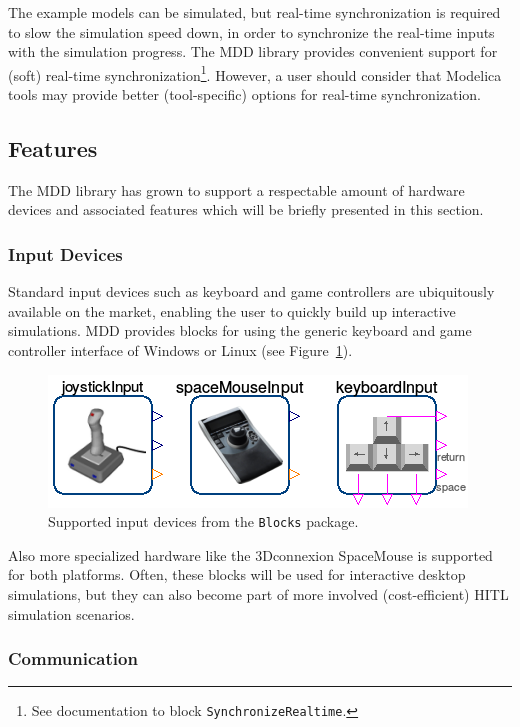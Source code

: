 \documentclass{resources/modelica}
\newcommand{\modelica}[1]{\lstinline[language=modelica]|#1|}
\begin{document}
\noindent
The example models can be simulated, but real-time synchronization is
required to slow the simulation speed down, in order to synchronize the
real-time inputs with the simulation progress.
The MDD library provides convenient support for (soft) real-time
synchronization\footnote{See documentation to block
\mbox{\modelica{SynchronizeRealtime}.}
}.
However, a user should consider that Modelica tools may provide better (tool-specific) options for real-time synchronization.

\subsection{Features}

The MDD library has grown to support a respectable amount of hardware devices
and associated features which will be briefly presented in this section.

\subsubsection{Input Devices}

Standard input devices such as keyboard and game controllers are ubiquitously
available on the market, enabling the user to quickly build up interactive simulations.
MDD provides blocks for using the generic keyboard and game controller interface
of Windows or Linux (see Figure~\ref{fig:OverviewInputDevices}).
\begin{figure}[h]
  \centering
  \includegraphics[width=0.7\columnwidth]{figures/OverviewInputDevices}
  \caption{Supported input devices from the \modelica{Blocks} package.}
  \label{fig:OverviewInputDevices}
\end{figure}

\noindent
Also more
specialized hardware like the 3Dconnexion SpaceMouse is supported for both platforms.
Often, these blocks will be used for interactive desktop simulations, but they
can also become part of more involved (cost-efficient) HITL simulation
scenarios.

\subsubsection{Communication}
\label{sec:Communication}
\end{document}
